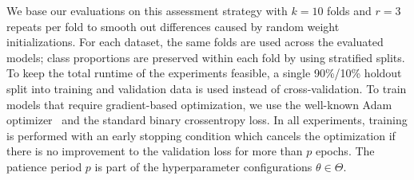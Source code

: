 We base our evaluations on this assessment strategy with $k = 10$ folds and $r = 3$ repeats per fold to smooth out differences caused by random weight initializations.
For each dataset, the same folds are used across the evaluated models; class proportions are preserved within each fold by using stratified splits.
To keep the total runtime of the experiments feasible, a single 90\%/10\% holdout split into training and validation data is used instead of cross-validation.
To train models that require gradient-based optimization, we use the well-known Adam optimizer~\cite{Kingma2015} and the standard binary crossentropy loss.
In all experiments, training is performed with an early stopping condition which cancels the optimization if there is no improvement to the validation loss for more than $p$ epochs.
The patience period $p$ is part of the hyperparameter configurations $\theta \in \Theta$.

